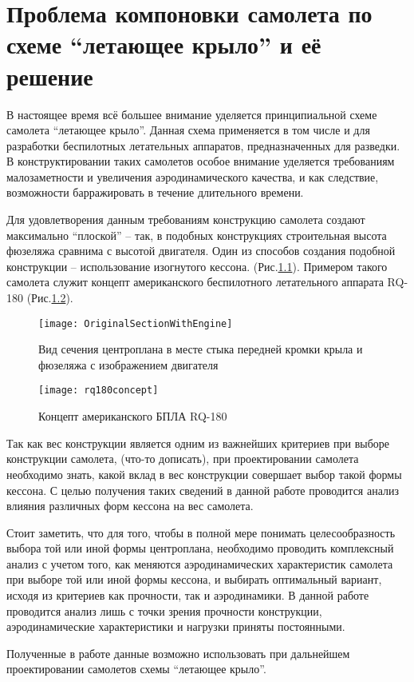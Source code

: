 \chapter{Проблема компоновки самолета по схеме ``летающее крыло'' и её решение}

В настоящее время всё большее внимание уделяется принципиальной схеме самолета ``летающее крыло''. Данная схема применяется в том числе и для разработки беспилотных летательных аппаратов, предназначенных для разведки. В конструктировании таких самолетов особое внимание уделяется требованиям малозаметности и увеличения аэродинамического качества, и как следствие, возможности барражировать в течение длительного времени. 

Для удовлетворения данным требованиям конструкцию самолета создают максимально ``плоской'' -- так, в подобных конструкциях строительная высота фюзеляжа сравнима с высотой двигателя. Один из способов создания подобной конструкции -- использование изогнутого кессона. (Рис.\ref{fig:OriginalSectionWithEngine}). Примером такого самолета служит концепт американского беспилотного летательного аппарата RQ-180 (Рис.\ref{fig:rq180}). 

\begin{figure}[ht]
\centering
\texttt{[image: OriginalSectionWithEngine]}
\caption{Вид сечения центроплана в месте стыка передней кромки крыла и фюзеляжа с изображением двигателя}
\label{fig:OriginalSectionWithEngine}
\end{figure}

\begin{figure}[ht]
\centering
\texttt{[image: rq180concept]}
\caption{Концепт американского БПЛА RQ-180 \cite{AvWeekUAV}}
\label{fig:rq180}
\end{figure}

Так как вес конструкции является одним из важнейших критериев при выборе конструкции самолета, (что-то дописать), при проектировании самолета необходимо знать, какой вклад в вес конструкции совершает выбор такой формы кессона. С целью получения таких сведений в данной работе проводится анализ влияния различных форм кессона на вес самолета. 

Стоит заметить, что для того, чтобы в полной мере понимать целесообразность выбора той или иной формы центроплана, необходимо проводить комплексный анализ с учетом того, как меняются аэродинамических характеристик самолета при выборе той или иной формы кессона, и выбирать оптимальный вариант, исходя из критериев как прочности, так и аэродинамики. В данной работе проводится анализ лишь с точки зрения прочности конструкции, аэродинамические характеристики и нагрузки приняты постоянными. 

Полученные в работе данные возможно использовать при дальнейшем проектировании самолетов схемы ``летающее крыло''. 

